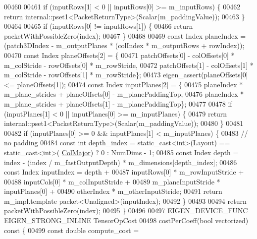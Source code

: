 \begin{DoxyCode}
00460 
00461     \textcolor{keywordflow}{if} (inputRows[1] < 0 || inputRows[0] >= m\_inputRows) \{
00462       \textcolor{keywordflow}{return} internal::pset1<PacketReturnType>(Scalar(m\_paddingValue));
00463     \}
00464 
00465     \textcolor{keywordflow}{if} (inputRows[0] != inputRows[1]) \{
00466       \textcolor{keywordflow}{return} packetWithPossibleZero(index);
00467     \}
00468 
00469     \textcolor{keyword}{const} Index planeIndex = (patch3DIndex - m\_outputPlanes * (colIndex * m\_outputRows + rowIndex));
00470     \textcolor{keyword}{const} Index planeOffsets[2] = \{
00471       patchOffsets[0] - colOffsets[0] * m\_colStride - rowOffsets[0] * m\_rowStride,
00472       patchOffsets[1] - colOffsets[1] * m\_colStride - rowOffsets[1] * m\_rowStride\};
00473     eigen\_assert(planeOffsets[0] <= planeOffsets[1]);
00474     \textcolor{keyword}{const} Index inputPlanes[2] = \{
00475       planeIndex * m\_plane\_strides + planeOffsets[0] - m\_planePaddingTop,
00476       planeIndex * m\_plane\_strides + planeOffsets[1] - m\_planePaddingTop\};
00477 
00478     \textcolor{keywordflow}{if} (inputPlanes[1] < 0 || inputPlanes[0] >= m\_inputPlanes) \{
00479       \textcolor{keywordflow}{return} internal::pset1<PacketReturnType>(Scalar(m\_paddingValue));
00480     \}
00481 
00482     \textcolor{keywordflow}{if} (inputPlanes[0] >= 0 && inputPlanes[1] < m\_inputPlanes) \{
00483       \textcolor{comment}{// no padding}
00484       \textcolor{keyword}{const} \textcolor{keywordtype}{int} depth\_index = \textcolor{keyword}{static\_cast<}\textcolor{keywordtype}{int}\textcolor{keyword}{>}(Layout) == static\_cast<int>(
      \hyperlink{group__enums_ggaacded1a18ae58b0f554751f6cdf9eb13a0cbd4bdd0abcfc0224c5fcb5e4f6669a}{ColMajor}) ? 0 : NumDims - 1;
00485       \textcolor{keyword}{const} Index depth = index - (index / m\_fastOutputDepth) * m\_dimensions[depth\_index];
00486       \textcolor{keyword}{const} Index inputIndex = depth +
00487           inputRows[0] * m\_rowInputStride +
00488           inputCols[0] * m\_colInputStride +
00489           m\_planeInputStride * inputPlanes[0] +
00490           otherIndex * m\_otherInputStride;
00491       \textcolor{keywordflow}{return} m\_impl.template packet<Unaligned>(inputIndex);
00492     \}
00493 
00494     \textcolor{keywordflow}{return} packetWithPossibleZero(index);
00495   \}
00496 
00497   EIGEN\_DEVICE\_FUNC EIGEN\_STRONG\_INLINE TensorOpCost
00498   costPerCoeff(\textcolor{keywordtype}{bool} vectorized)\textcolor{keyword}{ const }\{
00499     \textcolor{keyword}{const} \textcolor{keywordtype}{double} compute\_cost =

\end{DoxyCode}
